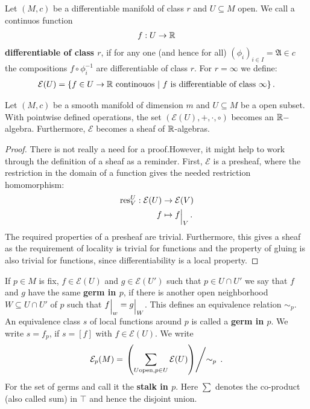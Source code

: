 \begin{definition}
    Let $(M,c)$ be a differentiable manifold of class $r$ and $U\subseteq M$ open. We call a continuos function 
    \begin{align*}
        f:U \to \mathbb{R}
    \end{align*} \textbf{differentiable of class $r$}, if for any one (and hence for all) $(\phi_i)_{i\in I}=\mathfrak{A}\in c$ the compositions $f\circ \phi_i^{-1}$ are differentiable of class $r$. For $r=\infty$ we define:
    \begin{align*}
        \mathcal{E}(U)=\{f\in U \to \mathbb{R} \text{ continouos}~|~ f \text{ is differentiable of class }\infty \} \, . 
    \end{align*}
\end{definition}
\begin{corollary}
    Let $(M,c)$ be a smooth manifold of dimension $m$ and $U\subseteq M$ be a open subset. With pointwise defined operations, the set $(\mathcal{E}(U),+,\cdot,\circ)$ becomes an $\mathbb{R}-$algebra. Furthermore, $\mathcal{E}$ becomes a sheaf of $\mathbb{R}$-algebras.
\end{corollary}
\begin{proof}
    There is not really a need for a proof.However, it might help to work through the definition of a sheaf as a reminder. First, $\mathcal{E}$ is a presheaf, where the restriction in the domain of a function gives the needed restriction homomorphism:
    \begin{align*}
        \text{res}^U_V: \mathcal{E}(U) &\to \mathcal{E}(V) \\
                                     f &\mapsto {f}\einsch{V} \, .
    \end{align*} The required properties of a presheaf are trivial. Furthermore, this gives a sheaf as the requirement of locality is trivial for functions and the property of gluing is also trivial for functions, since differentiability is a local property.
\end{proof}
\begin{definition}
    If $p\in M$ is fix, $f\in \mathcal{E}(U)$ and $g\in \mathcal{E}(U')$ such that $p\in U\cap U'$ we say that $f$ and $g$ have the same \textbf{germ in $p$}, if there is another open neighborhood $W\subseteq U\cap U'$ of $p$ such that ${f}\einsch{w}={g}\einsch{W}$. This defines an equivalence relation $\sim_p$. An equivalence class $s$ of local functions around $p$ is called a \textbf{germ in $p$}. We write $s=f_p$, if $s=[f]$ with $f\in \mathcal{E}(U)$. 
    We write 
    \begin{align*}
        \mathcal{E}_p(M)=\left. \left( \sum_{U \text{open},p\in U }\mathcal{E}(U)\right)\middle/ \sim_p \right. \, .
    \end{align*} For the set of germs and call it the \textbf{stalk in $p$}. Here $\sum$ denotes the co-product (also called sum)  in $\top$ and hence the disjoint union.
\end{definition}
